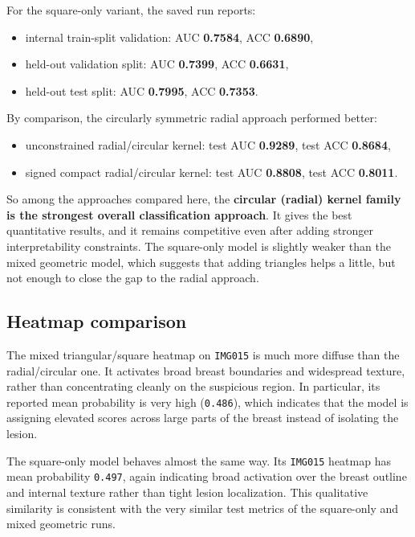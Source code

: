 \documentclass{article}
\begin{document}
For the square-only variant, the saved run reports:
\begin{itemize}
    \item internal train-split validation: AUC \textbf{0.7584}, ACC \textbf{0.6890},
    \item held-out validation split: AUC \textbf{0.7399}, ACC \textbf{0.6631},
    \item held-out test split: AUC \textbf{0.7995}, ACC \textbf{0.7353}.
\end{itemize}

By comparison, the circularly symmetric radial approach performed better:
\begin{itemize}
    \item unconstrained radial/circular kernel: test AUC \textbf{0.9289}, test ACC \textbf{0.8684},
    \item signed compact radial/circular kernel: test AUC \textbf{0.8808}, test ACC \textbf{0.8011}.
\end{itemize}

So among the approaches compared here, the \textbf{circular (radial) kernel family is the strongest overall classification approach}. It gives the best quantitative results, and it remains competitive even after adding stronger interpretability constraints. The square-only model is slightly weaker than the mixed geometric model, which suggests that adding triangles helps a little, but not enough to close the gap to the radial approach.

\subsection*{Heatmap comparison}
The mixed triangular/square heatmap on \texttt{IMG015} is much more diffuse than the radial/circular one. It activates broad breast boundaries and widespread texture, rather than concentrating cleanly on the suspicious region. In particular, its reported mean probability is very high (\texttt{0.486}), which indicates that the model is assigning elevated scores across large parts of the breast instead of isolating the lesion.

The square-only model behaves almost the same way. Its \texttt{IMG015} heatmap has mean probability \texttt{0.497}, again indicating broad activation over the breast outline and internal texture rather than tight lesion localization. This qualitative similarity is consistent with the very similar test metrics of the square-only and mixed geometric runs.
\end{document}
